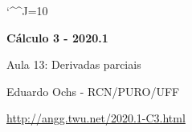 \documentclass[oneside,12pt]{article}
\begin{document}
\catcode`\^^J=10


\long{}
\long{}
\long{}
\long{}
\long{}
\long{}
\long{}
\long{}
\long{}
\long{}

\long{}
\long{}

\def\frown{\ensuremath{{=}{(}}}
\def\True {\mathbf{V}}
\def\False{\mathbf{F}}

\def\D{\displaystyle}

\def\co#1{{%
  \def\\{\char92}%
  \tt#1%
  }}

\def\drafturl{http://angg.twu.net/LATEX/2020-1-C2.pdf}
\def\drafturl{http://angg.twu.net/2020.1-C2.html}
\def\draftfooter{\tiny \href{\drafturl}{\jobname{}} \ColorBrown{\shorttoday{} \hours}}


%

\thispagestyle{empty}

\begin{center}

\vspace*{1.2cm}

{\bf \Large Cálculo 3 - 2020.1}

\bsk

Aula 13: Derivadas parciais

\bsk

Eduardo Ochs - RCN/PURO/UFF

\url{http://angg.twu.net/2020.1-C3.html}

\end{center}
\end{document}
